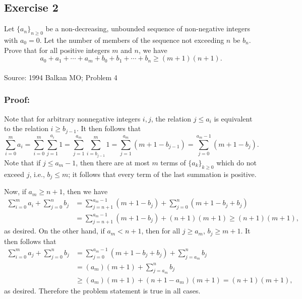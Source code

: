\documentclass[12pt]{article}
\begin{document}
\subsection*{Exercise 2}
Let $\{a_n \}_{n\ge 0}$ be a non-decreasing, unbounded sequence of non-negative integers with $a_0=0$.  Let the number of members of the sequence not exceeding $n$ be $b_n$.  Prove that for all positive integers $m$ and $n$, we have
$$ a_0 + a_1 + \dotsb + a_m + b_0 + b_1 + \dotsb + b_n \ge (m+1)(n+1) . $$
\\
Source: 1994 Balkan MO; Problem 4


\subsubsection*{Proof:}

Note that for arbitrary nonnegative integers $i,j$, the relation $j \le a_i$ is equivalent to the relation $i \ge b_{j-1}$.  It then follows that
$$ \sum_{i=0}^m a_i = \sum_{i=0}^m \sum_{j=1}^{a_i} 1 = \sum_{j=1}^{a_m} \sum_{i=b_{j-1}}^m 1 = \sum_{j=1}^{a_m} ( m+1 - b_{j-1} ) = \sum_{j=0}^{a_m-1} (m+1 - b_j ) . $$
Note that if $j \le a_m-1$, then there are at most $m$ terms of $\{ a_k\}_{k\ge 0}$ which do not exceed $j$, i.e., $b_j \le m$; it follows that every term of the last summation is positive.

Now, if $a_m \ge n+1$, then we have
$$ \begin{align*}
\sum_{i=0}^m a_i + \sum_{j=0}^n b_j &= \sum_{j=n+1}^{a_m-1}(m+1 - b_j) + \sum_{j=0}^n (m+1 - b_j + b_j) \\
&= \sum_{j=n+1}^{a_m-1}(m+1-b_j) + (n+1)(m+1) \ge (n+1)(m+1),
\end{align*} $$
as desired.  On the other hand, if $a_m < n+1$, then for all $j\ge a_m$, $b_j \ge m+1$.  It then follows that
$$ \begin{align*}
 \sum_{i=0}^m a_j + \sum_{j=0}^n b_j &= \sum_{j=0}^{a_m-1}(m+1 - b_j + b_j) + \sum_{j=a_m}^n b_j \\
&= (a_m)(m+1) + \sum_{j=a_m}^n b_j \\
&\ge (a_m)(m+1) + (n+1-a_m)(m+1) = (n+1)(m+1),
\end{align*} $$
as desired.  Therefore the problem statement is true in all cases.
\end{document}
